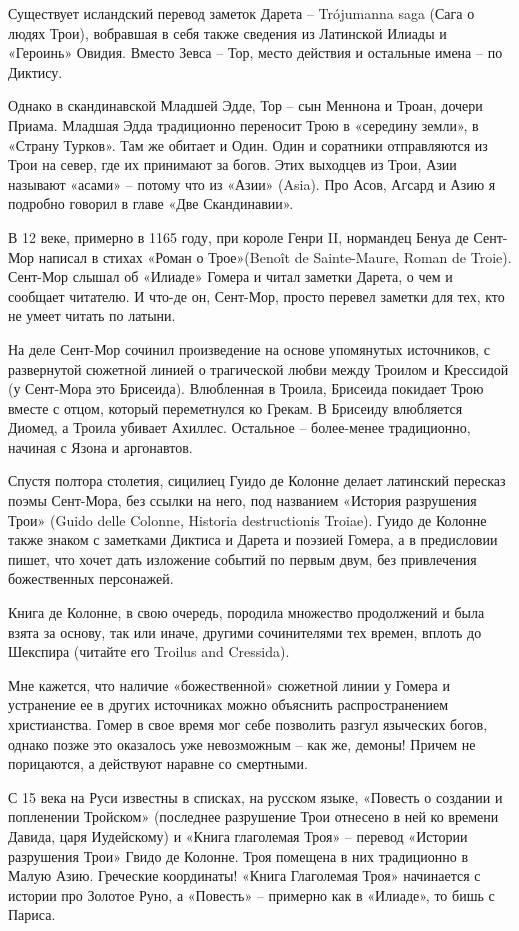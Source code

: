 Существует исландский перевод заметок Дарета – Trójumanna saga (Сага о людях Трои), вобравшая в себя также сведения из Латинской Илиады и «Героинь» Овидия. Вместо Зевса – Тор, место действия и остальные имена – по Диктису.

Однако в скандинавской Младшей Эдде, Тор – сын Меннона и Троан, дочери Приама. Младшая Эдда традиционно переносит Трою в «середину земли», в «Страну Турков». Там же обитает и Один. Один и соратники отправляются из Трои на север, где их принимают за богов. Этих выходцев из Трои, Азии называют «асами» – потому что из «Азии» (Asia). Про Асов, Агсард и Азию я подробно говорил в главе «Две Скандинавии».

В 12 веке, примерно в 1165 году, при короле Генри II, нормандец Бенуа де Сент-Мор написал в стихах «Роман о Трое»(Benoît de Sainte-Maure, Roman de Troie). Сент-Мор слышал об «Илиаде» Гомера и читал заметки Дарета, о чем и сообщает читателю. И что-де он, Сент-Мор, просто перевел заметки для тех, кто не умеет читать по латыни.

На деле Сент-Мор сочинил произведение на основе упомянутых источников, с развернутой сюжетной линией о трагической любви между Троилом и Крессидой (у Сент-Мора это Брисеида). Влюбленная в Троила, Брисеида покидает Трою вместе с отцом, который переметнулся ко Грекам. В Брисеиду влюбляется Диомед, а Троила убивает Ахиллес. Остальное – более-менее традиционно, начиная с Язона и аргонавтов.

Спустя полтора столетия, сицилиец Гуидо де Колонне делает латинский пересказ поэмы Сент-Мора, без ссылки на него, под названием «История разрушения Трои» (Guido delle Colonne, Historia destructionis Troiae). Гуидо де Колонне также знаком с заметками Диктиса и Дарета и поэзией Гомера, а в предисловии пишет, что хочет дать изложение событий по первым двум, без привлечения божественных персонажей.

Книга де Колонне, в свою очередь, породила множество продолжений и была взята за основу, так или иначе, другими сочинителями тех времен, вплоть до Шекспира (читайте его Troilus and Cressida).

Мне кажется, что наличие «божественной» сюжетной линии у Гомера и устранение ее в других источниках можно объяснить распространением христианства. Гомер в свое время мог себе позволить разгул языческих богов, однако позже это оказалось уже невозможным – как же, демоны! Причем не порицаются, а действуют наравне со смертными.

С 15 века на Руси известны в списках, на русском языке, «Повесть о создании и попленении Тройском» (последнее разрушение Трои отнесено в ней ко времени Давида, царя Иудейскому) и «Книга глаголемая Троя» – перевод «Истории разрушения Трои» Гвидо де Колонне. Троя помещена в них традиционно в Малую Азию. Греческие координаты! «Книга Глаголемая Троя» начинается с истории про Золотое Руно, а «Повесть» – примерно как в «Илиаде», то бишь с Париса.

